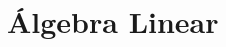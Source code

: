 \documentclass[11pt,fleqn]{book} %
\begin{document}





%
%
%
%
%
%
\part{Álgebra Linear}						%




%
%
%
%
%
%
\end{document}
